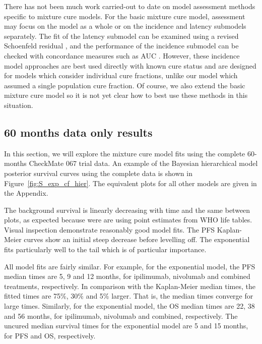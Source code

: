 \documentclass[AMA,STIX1COL]{WileyNJD-v2}
\begin{document}

There has not been much work carried-out to date on model assessment methods specific to mixture cure models.
For the basic mixture cure model, assessment may focus on the model as a whole or on the incidence and latency submodels separately.
The fit of the latency submodel can be examined using a revised Schoenfeld residual \cite{Wileyto2013}, and the performance of the incidence submodel can be checked with concordance measures such as AUC \cite{Peng2021}.
However, these incidence model approaches are best used directly with known cure status and are designed for models which consider individual cure fractions, unlike our model which assumed a single population cure fraction.
Of course, we also extend the basic mixture cure model so it is not yet clear how to best use these methods in this situation. 

%
\subsection{60 months data only results} \label{sec:results}
In this section, we will explore the mixture cure model fits using the complete 60-months CheckMate 067 trial data.
An example of the Bayesian hierarchical model posterior survival curves using the complete data is shown in Figure~\ref{fig:S_exp_cf_hier}.
The equivalent plots for all other models are given in the Appendix.

The background survival is linearly decreasing with time and the same between plots, as expected because were are using point estimates from WHO life tables.
Visual inspection demonstrate reasonably good model fits.
The PFS Kaplan-Meier curves show an initial steep decrease before levelling off.
The exponential fits particularly well to the tail which is of particular importance.

All model fits are fairly similar. For example, for the exponential model, the PFS median times are 5, 9 and 12 months, for ipilimumab, nivolumab and combined treatments, respectively.
In comparison with the Kaplan-Meier median times, the fitted times are 75\%, 30\% and 5\% larger. That is, the median times converge for large times.
Similarly, for the exponential model, the OS median times are 22, 38 and 56 months, for ipilimumab, nivolumab and combined, respectively.
The uncured median survival times for the exponential model are 5 and 15 months, for PFS and OS, respectively.
\end{document}
